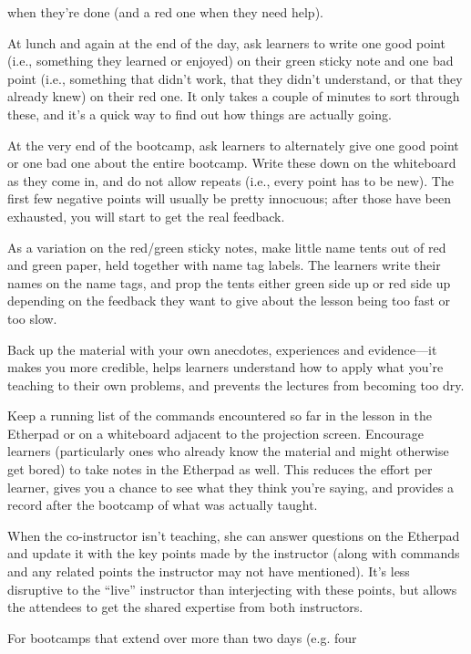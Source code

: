 \documentclass{book}
\begin{document}
\begin{swcitemize}
  when they're done (and a red one when they need help).
\item
  At lunch and again at the end of the day, ask learners to write one
  good point (i.e., something they learned or enjoyed) on their green
  sticky note and one bad point (i.e., something that didn't work, that
  they didn't understand, or that they already knew) on their red one.
  It only takes a couple of minutes to sort through these, and it's a
  quick way to find out how things are actually going.
\item
  At the very end of the bootcamp, ask learners to alternately give one
  good point or one bad one about the entire bootcamp. Write these down
  on the whiteboard as they come in, and do not allow repeats (i.e.,
  every point has to be new). The first few negative points will usually
  be pretty innocuous; after those have been exhausted, you will start
  to get the real feedback.
\item
  As a variation on the red/green sticky notes, make little name tents
  out of red and green paper, held together with name tag labels. The
  learners write their names on the name tags, and prop the tents either
  green side up or red side up depending on the feedback they want to
  give about the lesson being too fast or too slow.
\item
  Back up the material with your own anecdotes, experiences and
  evidence---it makes you more credible, helps learners understand how
  to apply what you're teaching to their own problems, and prevents the
  lectures from becoming too dry.
\item
  Keep a running list of the commands encountered so far in the lesson
  in the Etherpad or on a whiteboard adjacent to the projection screen.
  Encourage learners (particularly ones who already know the material
  and might otherwise get bored) to take notes in the Etherpad as well.
  This reduces the effort per learner, gives you a chance to see what
  they think you're saying, and provides a record after the bootcamp of
  what was actually taught.
\item
  When the co-instructor isn't teaching, she can answer questions on the
  Etherpad and update it with the key points made by the instructor
  (along with commands and any related points the instructor may not
  have mentioned). It's less disruptive to the ``live'' instructor than
  interjecting with these points, but allows the attendees to get the
  shared expertise from both instructors.
\item
  For bootcamps that extend over more than two days (e.g. four

\end{swcitemize}
\end{document}
